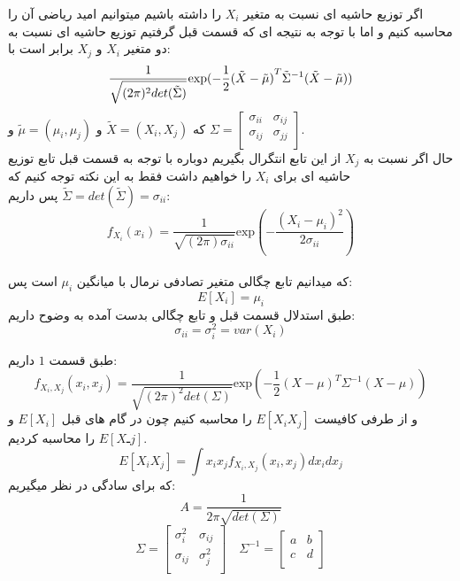 \parte{}
اگر توزیع حاشیه ای نسبت به متغیر $X_i$  را داشته باشیم میتوانیم امید ریاضی آن را محاسبه کنیم و اما با توجه به نتیجه ای که قسمت قبل گرفتیم
توزیع حاشیه ای نسبت به دو متغیر $X_i$ و $X_j$ برابر است با:\\
\[ 
    \frac{1}{\sqrt{(2\pi)^2 det(\tilde{\Sigma})}} \text{exp}(-\frac{1}{2}{(\tilde{X} - \tilde{\mu})}^{T}\Tilde{\Sigma}^{-1}(\tilde{X} - \tilde{\mu}))
\]
که $\tilde{X} = (X_i,X_j)$ و $\tilde{\mu} = (\mu_i,\mu_j)$ و $\Sigma = 
\begin{bmatrix}
    \sigma_{ii} & \sigma_{ij} \\
    \sigma_{ij} & \sigma_{jj} \\
\end{bmatrix}
$.\\
حال اگر نسبت به $X_j$ از این تابع انتگرال بگیریم دوباره با توجه به قسمت قبل تابع توزیع حاشیه ای برای $X_i$ را خواهیم داشت
فقط به این نکته توجه کنیم که $\tilde{\Sigma} = det(\tilde{\Sigma}) = \sigma_{ii}$ پس داریم:\\
\[ 
    f_{X_i}(x_i) =  \frac{1}{\sqrt{(2\pi)\sigma_{ii}}} \text{exp}(-\frac{(X_i - \mu_i)^2}{2\sigma_{ii}})
\]
\\
 که میدانیم تابع چگالی متغیر تصادفی نرمال با میانگین $\mu_i$ است پس:
 \[ E[X_i] = \mu_i\]
\parte{}
طبق استدلال قسمت قبل و تابع چگالی بدست آمده به وضوح داریم:\\
\[\sigma_{ii} = \sigma_{i}^2 = var(X_i) \]



\parte{}
طبق قسمت $1$ داریم:\\
\[
    f_{X_i,X_j}(x_i,x_j)=\frac{1}{\sqrt{(2\pi)^2 det({\Sigma})}} \text{exp}(-\frac{1}{2}{({X} - {\mu})}^{T}{\Sigma}^{-1}({X} -{\mu}))
\]
و از طرفی کافیست $E[X_i X_j]$ 
را محاسبه کنیم چون در گام های قبل $E[X_i]$
و $E[Xـj]$
را محاسبه کردیم.
\[
    E[X_i X_j] = \int{x_i x_j f_{X_i,X_j}(x_i,x_j)} dx_i dx_j 
\]
که برای سادگی در نظر میگیریم:\\
\[
    A = \frac{1}{2\pi\sqrt{det({\Sigma})}}
\]
\[
    \Sigma = \begin{bmatrix}
        \sigma_{i}^2 & \sigma_{ij} \\
        \sigma_{ij} & \sigma_{j}^2 \\
    \end{bmatrix}  
    \quad
    \Sigma^{-1} = \begin{bmatrix}
        a & b \\
        c & d \\
    \end{bmatrix}  
\]
\\


